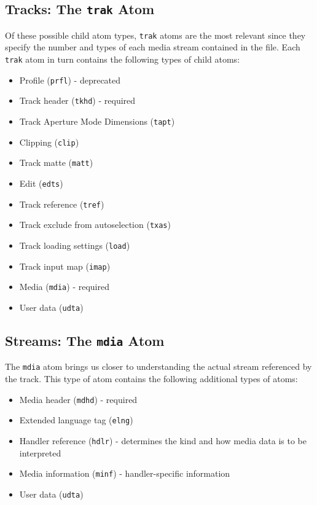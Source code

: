 \subsection{Tracks: The \texttt{trak} Atom}

Of these possible child atom types, \texttt{trak} atoms are the most relevant since they specify the number and types of each media stream contained in the file. Each \texttt{trak} atom in turn contains the following types of child atoms:

\begin{itemize}
	\item Profile (\texttt{prfl}) - deprecated
	\item Track header (\texttt{tkhd}) - required
	\item Track Aperture Mode Dimensions (\texttt{tapt})
	\item Clipping (\texttt{clip})
	\item Track matte (\texttt{matt})
	\item Edit (\texttt{edts})
	\item Track reference (\texttt{tref})
	\item Track exclude from autoselection (\texttt{txas})
	\item Track loading settings (\texttt{load})
	\item Track input map (\texttt{imap})
	\item Media (\texttt{mdia}) - required
	\item User data (\texttt{udta})
\end{itemize}

\subsection{Streams: The \texttt{mdia} Atom}

The \texttt{mdia} atom brings us closer to understanding the actual stream referenced by the track. This type of atom contains the following additional types of atoms:

\begin{itemize}
	\item Media header (\texttt{mdhd}) - required
	\item Extended language tag (\texttt{elng})
	\item Handler reference (\texttt{hdlr}) - determines the kind and how media data is to be interpreted
	\item Media information (\texttt{minf}) - handler-specific information
	\item User data (\texttt{udta})
\end{itemize}

